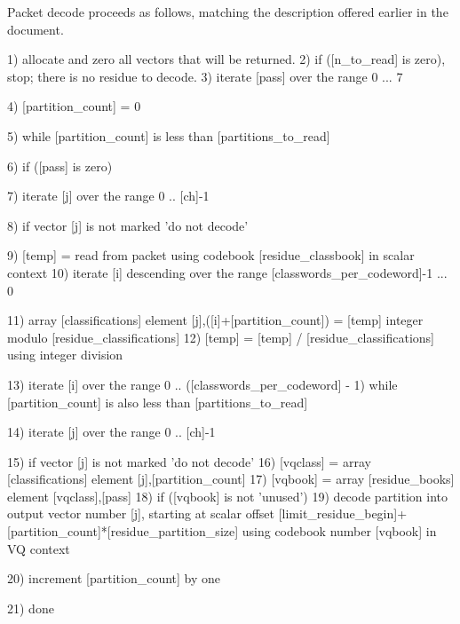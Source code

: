 Packet decode proceeds as follows, matching the description offered earlier in the document.
\begin{programlisting}
  1) allocate and zero all vectors that will be returned.
  2) if ([n\_to\_read] is zero), stop; there is no residue to decode.
  3) iterate [pass] over the range 0 ... 7 {
       4) [partition\_count] = 0

       5) while [partition\_count] is less than [partitions\_to\_read]

            6) if ([pass] is zero) {
                 7) iterate [j] over the range 0 .. [ch]-1 {
                      8) if vector [j] is not marked 'do not decode' {
                           9) [temp] = read from packet using codebook [residue\_classbook] in scalar context
                          10) iterate [i] descending over the range [classwords\_per\_codeword]-1 ... 0 {
                               11) array [classifications] element [j],([i]+[partition\_count]) =
                                   [temp] integer modulo [residue\_classifications]
                               12) [temp] = [temp] / [residue\_classifications] using integer division

                              }

                         }

                    }

               }

           13) iterate [i] over the range 0 .. ([classwords\_per\_codeword] - 1) while [partition\_count]
               is also less than [partitions\_to\_read] {
                 14) iterate [j] over the range 0 .. [ch]-1 {
                      15) if vector [j] is not marked 'do not decode' {
                           16) [vqclass] = array [classifications] element [j],[partition\_count]
                           17) [vqbook] = array [residue\_books] element [vqclass],[pass]
                           18) if ([vqbook] is not 'unused') {
                                19) decode partition into output vector number [j], starting at scalar
                                    offset [limit\_residue\_begin]+[partition\_count]*[residue\_partition\_size] using
                                    codebook number [vqbook] in VQ context
                          }
                     }

                 20) increment [partition\_count] by one

               }
          }
     }

 21) done

\end{programlisting}

